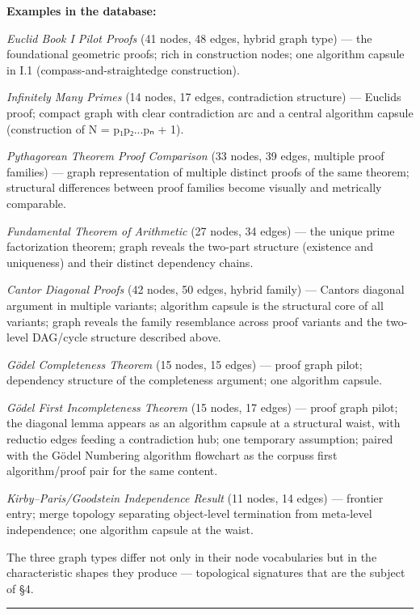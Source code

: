 \documentclass[
  11pt]{article}
\begin{document}
\textbf{Examples in the database:}

\emph{Euclid Book I Pilot Proofs} (41 nodes, 48 edges, hybrid graph
type) --- the foundational geometric proofs; rich in construction nodes;
one algorithm capsule in I.1 (compass-and-straightedge construction).

\emph{Infinitely Many Primes} (14 nodes, 17 edges, contradiction
structure) --- Euclid\textquotesingle s proof; compact graph with clear
contradiction arc and a central algorithm capsule (construction of N =
p₁p₂...pₙ + 1).

\emph{Pythagorean Theorem Proof Comparison} (33 nodes, 39 edges,
multiple proof families) --- graph representation of multiple distinct
proofs of the same theorem; structural differences between proof
families become visually and metrically comparable.

\emph{Fundamental Theorem of Arithmetic} (27 nodes, 34 edges) --- the
unique prime factorization theorem; graph reveals the two-part structure
(existence and uniqueness) and their distinct dependency chains.

\emph{Cantor Diagonal Proofs} (42 nodes, 50 edges, hybrid family) ---
Cantor\textquotesingle s diagonal argument in multiple variants;
algorithm capsule is the structural core of all variants; graph reveals
the family resemblance across proof variants and the two-level DAG/cycle
structure described above.

\emph{Gödel Completeness Theorem} (15 nodes, 15 edges) --- proof graph
pilot; dependency structure of the completeness argument; one algorithm
capsule.

\emph{Gödel First Incompleteness Theorem} (15 nodes, 17 edges) --- proof
graph pilot; the diagonal lemma appears as an algorithm capsule at a
structural waist, with reductio edges feeding a contradiction hub; one
temporary assumption; paired with the Gödel Numbering algorithm
flowchart as the corpus\textquotesingle s first algorithm/proof pair for
the same content.

\emph{Kirby--Paris/Goodstein Independence Result} (11 nodes, 14 edges)
--- frontier entry; merge topology separating object-level termination
from meta-level independence; one algorithm capsule at the waist.

The three graph types differ not only in their node vocabularies but in
the characteristic shapes they produce --- topological signatures that
are the subject of §4.

\begin{center}\rule{0.5\linewidth}{0.5pt}\end{center}
\end{document}
